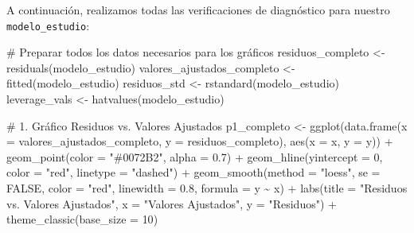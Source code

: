 \documentclass[
  letterpaper,
  DIV=11,
  numbers=noendperiod]{scrreprt}
\newenvironment{Shaded}{\begin{snugshade}}{\end{snugshade}}
\newcommand{\AttributeTok}[1]{\textcolor[rgb]{0.40,0.45,0.13}{#1}}
\newcommand{\CommentTok}[1]{\textcolor[rgb]{0.37,0.37,0.37}{#1}}
\newcommand{\ConstantTok}[1]{\textcolor[rgb]{0.56,0.35,0.01}{#1}}
\newcommand{\DecValTok}[1]{\textcolor[rgb]{0.68,0.00,0.00}{#1}}
\newcommand{\FloatTok}[1]{\textcolor[rgb]{0.68,0.00,0.00}{#1}}
\newcommand{\FunctionTok}[1]{\textcolor[rgb]{0.28,0.35,0.67}{#1}}
\newcommand{\NormalTok}[1]{\textcolor[rgb]{0.00,0.23,0.31}{#1}}
\newcommand{\OtherTok}[1]{\textcolor[rgb]{0.00,0.23,0.31}{#1}}
\newcommand{\SpecialCharTok}[1]{\textcolor[rgb]{0.37,0.37,0.37}{#1}}
\newcommand{\StringTok}[1]{\textcolor[rgb]{0.13,0.47,0.30}{#1}}
\begin{document}
\begin{tcolorbox}[enhanced jigsaw, leftrule=.75mm, breakable, colbacktitle=quarto-callout-tip-color!10!white, bottomrule=.15mm, colframe=quarto-callout-tip-color-frame, toprule=.15mm, colback=white, coltitle=black, bottomtitle=1mm, left=2mm, title=\textcolor{quarto-callout-tip-color}{\faLightbulb}\hspace{0.5em}{Diagnóstico completo del modelo de estudio}, opacityback=0, arc=.35mm, opacitybacktitle=0.6, toptitle=1mm, titlerule=0mm, rightrule=.15mm]

A continuación, realizamos todas las verificaciones de diagnóstico para
nuestro \texttt{modelo\_estudio}:

\begin{Shaded}
\begin{Highlighting}[]
\CommentTok{\# Preparar todos los datos necesarios para los gráficos}
\NormalTok{residuos\_completo }\OtherTok{\textless{}{-}} \FunctionTok{residuals}\NormalTok{(modelo\_estudio)}
\NormalTok{valores\_ajustados\_completo }\OtherTok{\textless{}{-}} \FunctionTok{fitted}\NormalTok{(modelo\_estudio)}
\NormalTok{residuos\_std }\OtherTok{\textless{}{-}} \FunctionTok{rstandard}\NormalTok{(modelo\_estudio)}
\NormalTok{leverage\_vals }\OtherTok{\textless{}{-}} \FunctionTok{hatvalues}\NormalTok{(modelo\_estudio)}

\CommentTok{\# 1. Gráfico Residuos vs. Valores Ajustados}
\NormalTok{p1\_completo }\OtherTok{\textless{}{-}} \FunctionTok{ggplot}\NormalTok{(}\FunctionTok{data.frame}\NormalTok{(}\AttributeTok{x =}\NormalTok{ valores\_ajustados\_completo, }\AttributeTok{y =}\NormalTok{ residuos\_completo), }
                      \FunctionTok{aes}\NormalTok{(}\AttributeTok{x =}\NormalTok{ x, }\AttributeTok{y =}\NormalTok{ y)) }\SpecialCharTok{+}
  \FunctionTok{geom\_point}\NormalTok{(}\AttributeTok{color =} \StringTok{"\#0072B2"}\NormalTok{, }\AttributeTok{alpha =} \FloatTok{0.7}\NormalTok{) }\SpecialCharTok{+}
  \FunctionTok{geom\_hline}\NormalTok{(}\AttributeTok{yintercept =} \DecValTok{0}\NormalTok{, }\AttributeTok{color =} \StringTok{"red"}\NormalTok{, }\AttributeTok{linetype =} \StringTok{"dashed"}\NormalTok{) }\SpecialCharTok{+}
  \FunctionTok{geom\_smooth}\NormalTok{(}\AttributeTok{method =} \StringTok{"loess"}\NormalTok{, }\AttributeTok{se =} \ConstantTok{FALSE}\NormalTok{, }\AttributeTok{color =} \StringTok{"red"}\NormalTok{, }\AttributeTok{linewidth =} \FloatTok{0.8}\NormalTok{, }\AttributeTok{formula =}\NormalTok{ y }\SpecialCharTok{\textasciitilde{}}\NormalTok{ x) }\SpecialCharTok{+}
  \FunctionTok{labs}\NormalTok{(}\AttributeTok{title =} \StringTok{"Residuos vs. Valores Ajustados"}\NormalTok{, }\AttributeTok{x =} \StringTok{"Valores Ajustados"}\NormalTok{, }\AttributeTok{y =} \StringTok{"Residuos"}\NormalTok{) }\SpecialCharTok{+}
  \FunctionTok{theme\_classic}\NormalTok{(}\AttributeTok{base\_size =} \DecValTok{10}\NormalTok{)}


\end{Highlighting}
\end{Shaded}
\end{tcolorbox}
\end{document}
